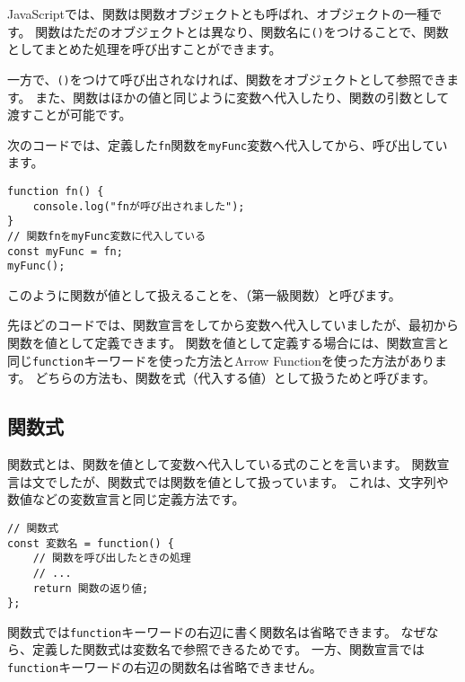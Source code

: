 JavaScriptでは、関数は関数オブジェクトとも呼ばれ、オブジェクトの一種です。
関数はただのオブジェクトとは異なり、関数名に\texttt{()}をつけることで、関数としてまとめた処理を呼び出すことができます。

一方で、\texttt{()}をつけて呼び出されなければ、関数をオブジェクトとして参照できます。
また、関数はほかの値と同じように変数へ代入したり、関数の引数として渡すことが可能です。

次のコードでは、定義した\texttt{fn}関数を\texttt{myFunc}変数へ代入してから、呼び出しています。

\begin{lstlisting}
function fn() {
    console.log("fnが呼び出されました");
}
// 関数fnをmyFunc変数に代入している
const myFunc = fn;
myFunc();
\end{lstlisting}

このように関数が値として扱えることを、\textbf{}（第一級関数）と呼びます。

先ほどのコードでは、関数宣言をしてから変数へ代入していましたが、最初から関数を値として定義できます。
関数を値として定義する場合には、関数宣言と同じ\texttt{function}キーワードを使った方法とArrow
Functionを使った方法があります。
どちらの方法も、関数を式（代入する値）として扱うため\textbf{}と呼びます。

\hypertarget{function-expression}{%
\subsection{関数式}\label{function-expression}}

関数式とは、関数を値として変数へ代入している式のことを言います。
関数宣言は文でしたが、関数式では関数を値として扱っています。
これは、文字列や数値などの変数宣言と同じ定義方法です。

\begin{lstlisting}
// 関数式
const 変数名 = function() {
    // 関数を呼び出したときの処理
    // ...
    return 関数の返り値;
};
\end{lstlisting}

関数式では\texttt{function}キーワードの右辺に書く関数名は省略できます。
なぜなら、定義した関数式は変数名で参照できるためです。
一方、関数宣言では\texttt{function}キーワードの右辺の関数名は省略できません。

